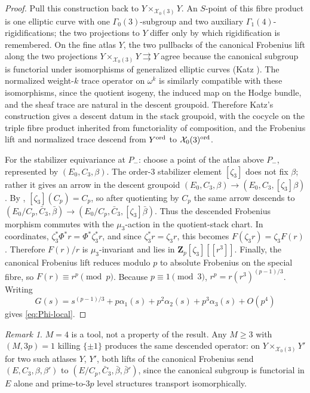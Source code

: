\documentclass[11pt]{amsart}
\theoremstyle{definition}
\theoremstyle{remark}
\newtheorem{remark}[theorem]{Remark}
\newcommand{\Z}{\mathbf{Z}}
\begin{document}
\begin{proof}
Pull this construction back to $Y\times_{\mathcal X_0(3)}Y$. An $S$-point of this fibre product is one elliptic curve with one $\Gamma_0(3)$-subgroup and two auxiliary $\Gamma_1(4)$-rigidifications; the two projections to $Y$ differ only by which rigidification is remembered. On the fine atlas $Y$, the two pullbacks of the canonical Frobenius lift along the two projections $Y\times_{\mathcal X_0(3)}Y\rightrightarrows Y$ agree because the canonical subgroup is functorial under isomorphisms of generalized elliptic curves (Katz \cite[Theorem~3.10.7]{Katz-padic}). The normalized weight-$k$ trace operator on $\omega^k$ is similarly compatible with these isomorphisms, since the quotient isogeny, the induced map on the Hodge bundle, and the sheaf trace are natural in the descent groupoid. Therefore Katz's construction gives a descent datum in the stack groupoid, with the cocycle on the triple fibre product inherited from functoriality of composition, and the Frobenius lift and normalized trace descend from $Y^{\rm ord}$ to $\mathcal X_0(3)^{\rm ord}$.

For the stabilizer equivariance at $P_-$: choose a point of the atlas above $P_-$, represented by $(E_0,C_3,\beta)$. The order-$3$ stabilizer element $[\zeta_3]$ does not fix $\beta$; rather it gives an arrow in the descent groupoid $(E_0,C_3,\beta)\to(E_0,C_3,[\zeta_3]\beta)$. By , $[\zeta_3](C_p)=C_p$, so after quotienting by $C_p$ the same arrow descends to $(E_0/C_p,\bar C_3,\bar\beta)\to(E_0/C_p,\bar C_3,[\zeta_3]\bar\beta)$. Thus the descended Frobenius morphism commutes with the $\mu_3$-action in the quotient-stack chart. In coordinates, $\zeta_3^*\Phi^*r=\Phi^*\zeta_3^*r$, and since $\zeta_3^*r=\zeta_3 r$, this becomes $F(\zeta_3 r)=\zeta_3 F(r)$. Therefore $F(r)/r$ is $\mu_3$-invariant and lies in $\Z_p[\zeta_3][[r^3]]$. Finally, the canonical Frobenius lift reduces modulo $p$ to absolute Frobenius on the special fibre, so $F(r)\equiv r^p\pmod p$. Because $p\equiv 1\pmod 3$, $r^p=r(r^3)^{(p-1)/3}$. Writing
\[
G(s)=s^{(p-1)/3}+p\alpha_1(s)+p^2\alpha_2(s)+p^3\alpha_3(s)+O(p^4)
\]
gives \eqref{eq:Phi-local}.
\end{proof}

\begin{remark}
$M=4$ is a tool, not a property of the result. Any $M\ge 3$ with $(M,3p)=1$ killing $\{\pm 1\}$ produces the same descended operator: on $Y\times_{\mathcal X_0(3)}Y'$ for two such atlases $Y$, $Y'$, both lifts of the canonical Frobenius send $(E,C_3,\beta,\beta')$ to $(E/C_p,\bar C_3,\bar\beta,\bar\beta')$, since the canonical subgroup is functorial in $E$ alone and prime-to-$3p$ level structures transport isomorphically.
\end{remark}
\end{document}
